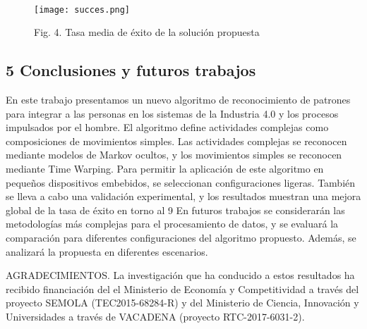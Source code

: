 \documentclass{paper}
\begin{document}
\ \begin{figure}[H]
    \centering
    \texttt{[image: succes.png]}
    \caption{Fig. 4. Tasa media de éxito de la solución propuesta}
    \label{fig:my_label}
\end{figure}



\subsection*{ 5  Conclusiones y futuros trabajos}

En este trabajo presentamos un nuevo algoritmo de reconocimiento de patrones para integrar a las personas en los sistemas de la Industria 4.0 y los procesos impulsados por el hombre. El algoritmo define actividades complejas
como composiciones de movimientos simples. Las actividades complejas se reconocen mediante modelos de Markov ocultos, y los movimientos simples se reconocen mediante Time Warping. Para permitir la aplicación de este algoritmo en pequeños dispositivos embebidos, se seleccionan configuraciones ligeras. También se lleva a cabo una validación experimental, y los resultados muestran una mejora global de la tasa de éxito en torno al 9%
En futuros trabajos se considerarán las metodologías más complejas para el procesamiento de datos, y se evaluará la comparación para diferentes configuraciones del algoritmo propuesto. Además, se analizará la propuesta en diferentes escenarios.

AGRADECIMIENTOS. La investigación que ha conducido a estos resultados ha recibido financiación del el Ministerio de Economía y Competitividad a través del proyecto SEMOLA (TEC2015-68284-R) y del Ministerio de Ciencia, Innovación y Universidades a través de VACADENA (proyecto RTC-2017-6031-2).
\end{document}
